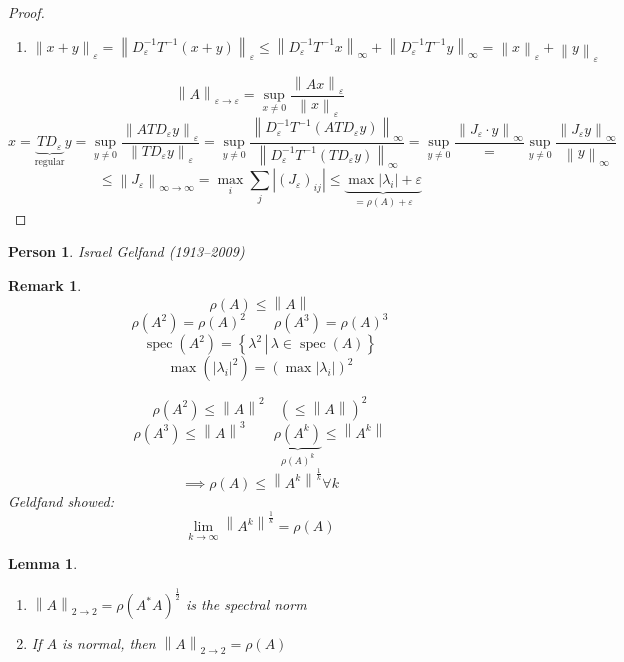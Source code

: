 \documentclass{article}
\newcounter{lecref}[section]
\numberwithin{lecref}{section}
\newtheorem{lemma}[lecref]{Lemma}
\newtheorem{remark}[lecref]{Remark}
\newtheorem*{person}{Person}
\newcommand{\setdef}[2]{\left\{\left.#1\,\right|\,#2\right\}}
\newcommand{\norm}[1]{\left\|#1\right\|}
\newcommand{\card}[1]{\left|#1\right|}
\begin{document}
\begin{proof}
\begin{enumerate}
    \item $\norm{x + y}_{\varepsilon} = \norm{D_{\varepsilon}^{-1} T^{-1} (x + y)}_{\varepsilon} \leq \norm{D_{\varepsilon}^{-1} T^{-1} x}_{\infty} + \norm{D^{-1}_{\varepsilon} T^{-1} y}_{\infty} = \norm{x}_{\varepsilon} + \norm{y}_{\varepsilon}$
  \end{enumerate}
  \[ \norm{A}_{\varepsilon\to\varepsilon} = \sup_{x \neq 0} \frac{\norm{Ax}_{\varepsilon}}{\norm{x}_{\varepsilon}} \]
  \[ x = \underbrace{TD_{\varepsilon}}_{\text{regular}} y = \sup_{y \neq 0} \frac{\norm{AT D_{\varepsilon} y}_{\varepsilon}}{\norm{TD_{\varepsilon} y}_{\varepsilon}} = \sup_{y \neq 0} \frac{\norm{D_{\varepsilon}^{-1} T^{-1} \left(ATD_{\varepsilon} y\right)}_{\infty}}{\norm{D_{\varepsilon}^{-1} T^{-1} \left(TD_{\varepsilon} y\right)}_{\infty}} = \sup_{y \neq 0} \frac{\norm{J_{\varepsilon} \cdot y}_{\infty}} = \sup_{y \neq 0} \frac{\norm{J_{\varepsilon} y}_{\infty}}{\norm{y}_{\infty}} \]
  \[ \leq \norm{J_{\varepsilon}}_{\infty \to \infty} = \max_i \sum_j \card{(J_{\varepsilon})_{ij}} \leq \underbrace{\max \card{\lambda_i} + \varepsilon}_{= \rho(A) + \varepsilon} \]
\end{proof}

\begin{person}
  Israel Gelfand (1913--2009)
\end{person}

\begin{remark} %
  \[ \rho(A) \leq \norm{A} \]
  \[ \rho(A^2) = \rho(A)^2 \qquad \rho(A^3) = \rho(A)^3 \]
  \[ \operatorname{spec}(A^2) = \setdef{\lambda^2}{\lambda \in \operatorname{spec}(A)} \]
  \[ \max(\card{\lambda_i}^2) = \left(\max\card{\lambda_i}\right)^2 \]

  \[ \rho(A^2) \leq \norm{A}^2 \quad (\leq \norm{A})^2 \]
  \[ \rho(A^3) \leq \norm{A}^3 \qquad \underbrace{\rho(A^k)}_{\rho(A)^k} \leq \norm{A^k} \]
  \[ \implies \rho(A) \leq \norm{A^k}^{\frac1k} \forall k \]
  Geldfand showed:
  \[ \lim_{k\to\infty} \norm{A^k}^{\frac1k} = \rho(A) \]
\end{remark}

\begin{lemma} %
  \begin{enumerate}
    \item $\norm{A}_{2\to2} = \rho(A^* A)^{\frac12}$ is the \emph{spectral norm}
    \item If $A$ is normal, then $\norm{A}_{2\to2} = \rho(A)$
  \end{enumerate}
\end{lemma}
\end{document}
